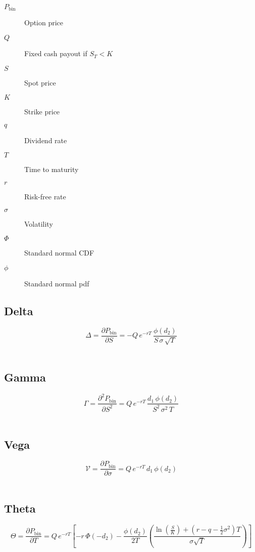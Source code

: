 \documentclass[12pt,a4paper]{article}
\begin{document}
\begin{description}
  \item[$P_{\mathrm{bin}}$] Option price
  \item[$Q$] Fixed cash payout if \( S_T < K \)
  \item[$S$] Spot price
  \item[$K$] Strike price
  \item[$q$] Dividend rate
  \item[$T$] Time to maturity
  \item[$r$] Risk-free rate
  \item[$\sigma$] Volatility
  \item[$\Phi$] Standard normal CDF
  \item[$\phi$] Standard normal pdf
\end{description}

\subsection{Delta}
\[
  \boxed{\Delta = \frac{\partial P_{\mathrm{bin}}}{\partial S}
  = -Q\, e^{-rT}\, \frac{\phi(d_2)}{S\,\sigma\,\sqrt{T}}}
\]

\[
  \begin{aligned}
  \end{aligned}
\]

\subsection{Gamma}
\[
  \boxed{\Gamma = \frac{\partial^2 P_{\mathrm{bin}}}{\partial S^2}
  = Q\, e^{-rT}\, \frac{d_1\,\phi(d_2)}{S^2\,\sigma^2\,T}}
\]

\[
  \begin{aligned}
  \end{aligned}
\]

\subsection{Vega}
\[
  \boxed{\mathcal{V} = \frac{\partial P_{\mathrm{bin}}}{\partial \sigma}
  = Q\, e^{-rT}\, d_1\,\phi(d_2)}
\]

\[
  \begin{aligned}
  \end{aligned}
\]

\subsection{Theta}
\[
  \boxed{\Theta = \frac{\partial P_{\mathrm{bin}}}{\partial T}
  = Q\, e^{-rT}\!\left[
  -r\,\Phi(-d_2)
  - \frac{\phi(d_2)}{2T}
    \left(
      \frac{\ln(\tfrac{S}{K}) + (r - q - \tfrac{1}{2}\sigma^2)T}{\sigma\sqrt{T}}
    \right)
  \right]}
\]
\end{document}
